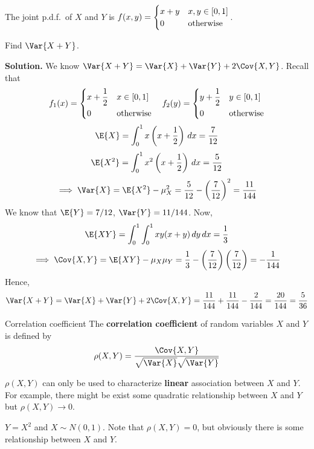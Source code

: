 \begin{Example}{}{}
    The joint p.d.f.\ of $ X $ and $ Y $ is
    $ f(x,y)=\begin{cases}
            x+y & x,y\in\interval{0}{1} \\
            0   & \text{otherwise}
        \end{cases} $.

    Find $ \Var{X+Y} $.

    \textbf{Solution.} We know $ \Var{X+Y}=\Var{X}+\Var{Y}+2\Cov{X,Y} $. Recall
    that
    \[ f_1(x)=\begin{dcases}
            x+\frac{1}{2} & x\in\interval{0}{1} \\
            0             & \text{otherwise}
        \end{dcases}\quad
        f_2(y)=\begin{dcases}
            y+\frac{1}{2} & y\in\interval{0}{1} \\
            0             & \text{otherwise}
        \end{dcases} \]
    \[ \E{X}=\int_{0}^{1} x\left( x+\frac{1}{2}  \right)\, d{x} =
        \frac{7}{12} \]
    \[ \E{X^2}=\int_{0}^{1} x^2\left( x+\frac{1}{2}  \right)\, d{x}=
        \frac{5}{12} \]
    \[ \implies\Var{X}=\E{X^2}-\mu_X^2=\frac{5}{12}-\left( \frac{7}{12} \right)^2=\frac{11}{144}  \]
    We know that $ \E{Y}=7/12 $, $ \Var{Y}=11/144 $. Now,
    \[ \E{XY}=
        \int_{0}^{1} \int_{0}^{1} x y(x+y)\, d{y}\, d{x}=\frac{1}{3}  \]
    \[ \implies \Cov{X,Y}=\E{XY}-\mu_X\mu_Y=
        \frac{1}{3} -\left( \frac{7}{12}  \right)\left( \frac{7}{12}  \right)=
        -\frac{1}{144}  \]
    Hence,
    \[ \Var{X+Y}=\Var{X}+\Var{Y}+2\Cov{X,Y}=
        \frac{11}{144} +\frac{11}{144} -\frac{2}{144} =\frac{20}{144}=\frac{5}{36} \]
\end{Example}
\begin{Definition}{Correlation coefficient}{}
    The \textbf{correlation coefficient} of
    random variables $ X $ and $ Y $ is defined by
    \[ \rho(X,Y)=\frac{\Cov{X,Y}}{\sqrt{\Var{X}}\sqrt{\Var{Y}}}  \]
\end{Definition}
\begin{Remark}{}{}
    $ \rho(X,Y) $ can only be used to characterize \textbf{linear} association
    between $ X $ and $ Y $. For example, there might be exist some quadratic
    relationship between $ X $ and $ Y $ but $ \rho(X,Y)\to 0 $.
\end{Remark}
\begin{Example}{}{}
    $ Y=X^2 $ and $ X \sim N(0,1) $. Note that $ \rho(X,Y)=0 $,
    but obviously there is some relationship between $ X $ and $ Y $.
\end{Example}
